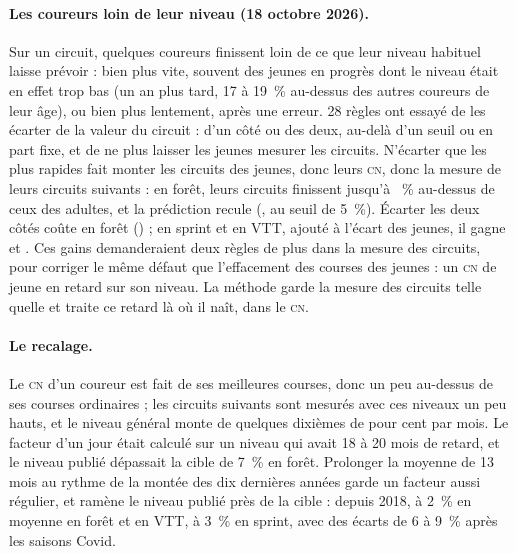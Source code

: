\documentclass[11pt,a4paper]{article}
\newcommand{\CN}{\textsc{cn}}
\begin{document}
\paragraph{Les coureurs loin de leur niveau (18 octobre 2026).} Sur un circuit, quelques coureurs finissent loin de ce que leur niveau habituel laisse prévoir : bien plus vite, souvent des jeunes en progrès dont le niveau était en effet trop bas (un an plus tard, 17 à 19~\% au-dessus des autres coureurs de leur âge), ou bien plus lentement, après une erreur. 28 règles ont essayé de les écarter de la valeur du circuit : d'un côté ou des deux, au-delà d'un seuil ou en part fixe, et de ne plus laisser les jeunes mesurer les circuits. N'écarter que les plus rapides fait monter les circuits des jeunes, donc leurs \CN, donc la mesure de leurs circuits suivants : en forêt, leurs circuits finissent jusqu'à \NoutLoop~\% au-dessus de ceux des adultes, et la prédiction recule (\NoutFast, \NoutFastFive{} au seuil de 5~\%). Écarter les deux côtés coûte en forêt (\NoutBothF) ; en sprint et en VTT, ajouté à l'écart des jeunes, il gagne \NoutXS{} et \NoutXV. Ces gains demanderaient deux règles de plus dans la mesure des circuits, pour corriger le même défaut que l'effacement des courses des jeunes : un \CN{} de jeune en retard sur son niveau. La méthode garde la mesure des circuits telle quelle et traite ce retard là où il naît, dans le \CN.

\paragraph{Le recalage.} Le \CN{} d'un coureur est fait de ses meilleures courses, donc un peu au-dessus de ses courses ordinaires ; les circuits suivants sont mesurés avec ces niveaux un peu hauts, et le niveau général monte de quelques dixièmes de pour cent par mois. Le facteur d'un jour était calculé sur un niveau qui avait 18 à 20 mois de retard, et le niveau publié dépassait la cible de 7~\% en forêt. Prolonger la moyenne de 13 mois au rythme de la montée des dix dernières années garde un facteur aussi régulier, et ramène le niveau publié près de la cible : depuis 2018, à 2~\% en moyenne en forêt et en VTT, à 3~\% en sprint, avec des écarts de 6 à 9~\% après les saisons Covid.
\end{document}
